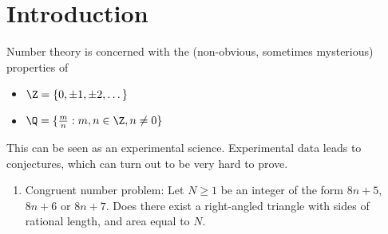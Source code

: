 \documentclass{article}
\begin{document}
\maketitle
\section{Introduction}
Number theory is concerned with the (non-obvious, sometimes mysterious) properties of
\begin{itemize}
    \item $\Z = \{0, \pm 1, \pm 2, \dots\}$
    \item $\Q = \{\frac{m}{n} : m, n \in \Z, n \ne 0\}$
\end{itemize}
This can be seen as an experimental science.  Experimental data leads to conjectures, which can turn out to be very hard to prove.
\begin{enumerate}
    \item Congruent number problem: Let $N \geq 1$ be an integer of the form $8n + 5$, $8n+6$ or $8n + 7$. Does there exist a right-angled triangle with sides of rational length, and area equal to $N$.
\end{enumerate}
\end{document}
